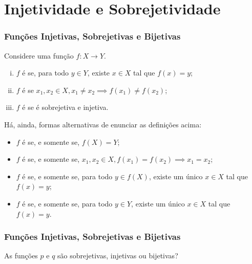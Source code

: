 \documentclass[brazil, notheorems, 10pt]{beamer}
\begin{document}
\section{Injetividade e Sobrejetividade}
\begin{frame}
\frametitle{Funções Injetivas, Sobrejetivas e Bijetivas} %


\begin{Def}
Considere uma função $f: X \to Y$.
\begin{enumerate}[(i)]
	\item $f$ é  se, para todo $y \in Y$, existe $x
	\in X$ tal que $f(x) = y$;
	\item $f$ é  se $x_1, x_2 \in X, x_1 \neq x_2
	\implies f(x_1) \neq f(x_2)$;
	\item $f$ é  se é sobrejetiva e injetiva.
\end{enumerate}
\end{Def}\pause
Há, ainda, formas alternativas de enunciar as definições acima:
\begin{itemize}
	\item $f$ é  se, e somente se, $f(X) = Y$;
	\item $f$ é  se, e somente se, $x_1, x_2 \in X, f(x_1) = f(x_2)
	\implies x_1 = x_2 $;
	\item $f$ é  se, e somente se, para todo $y \in
	f(X)$, existe um único $x \in X$ tal que $f(x) = y$;
	\item $f$ é  se, e somente se, para todo $y \in Y$,
	existe um único $x \in X$ tal que $f(x) = y$.
\end{itemize}
\end{frame}




\begin{frame}
\frametitle{Funções Injetivas, Sobrejetivas e Bijetivas} %

\begin{Exem}\label{pqbij}
As funções $p$ e $q$ são sobrejetivas, injetivas ou bijetivas?
\end{Exem}
\end{frame}



\end{document}
